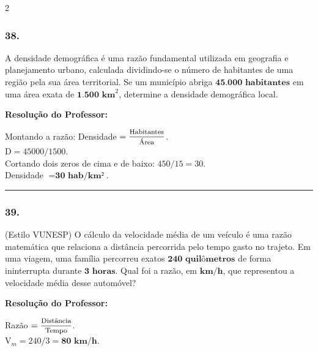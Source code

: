 \begin{multicols*}{2}
\subsubsection*{38.} A densidade demográfica é uma razão fundamental utilizada em geografia e planejamento urbano, calculada dividindo-se o número de habitantes de uma região pela sua área territorial. Se um município abriga $ \textbf{45.000 habitantes} $ em uma área exata de $ \textbf{1.500 km}^{2} $, determine a densidade demográfica local.

\ifgabarito
    \begin{tcolorbox}[colback=CorTitUm!5, colframe=CorTitUm, boxrule=1pt, arc=4pt, left=6pt, right=6pt, top=6pt, bottom=6pt]
    \small\textbf{\textcolor{CorTitUm}{Resolução do Professor:}}\par\vspace{0.1cm}
    \color{CinzaEscuro}
    Montando a razão: Densidade $= \mfrac{\text{Habitantes}}{\text{Área}} $.\\
    $ \text{D} = 45000 / 1500 $.\\
    Cortando dois zeros de cima e de baixo: $ 450 / 15 = 30 $.\\
    Densidade $= \textbf{30 hab/km²} $.
    \end{tcolorbox}
\fi

\par\vspace{\espacoQuestao}

\noindent\textcolor{CorLinha}{\rule{\linewidth}{0.5pt}} 
\par\vspace{\espacoPreQuestao}
\subsubsection*{39.} (Estilo VUNESP) O cálculo da velocidade média de um veículo é uma razão matemática que relaciona a distância percorrida pelo tempo gasto no trajeto. Em uma viagem, uma família percorreu exatos $ \textbf{240 quilômetros} $ de forma ininterrupta durante $ \textbf{3 horas} $. Qual foi a razão, em $ \textbf{km/h} $, que representou a velocidade média desse automóvel?

\ifgabarito
    \begin{tcolorbox}[colback=CorTitUm!5, colframe=CorTitUm, boxrule=1pt, arc=4pt, left=6pt, right=6pt, top=6pt, bottom=6pt]
    \small\textbf{\textcolor{CorTitUm}{Resolução do Professor:}}\par\vspace{0.1cm}
    \color{CinzaEscuro}
    Razão $= \mfrac{\text{Distância}}{\text{Tempo}} $.\\
    $ \text{V}_m = 240 / 3 = \textbf{80 km/h} $.
    \end{tcolorbox}
\fi


\end{multicols*}
